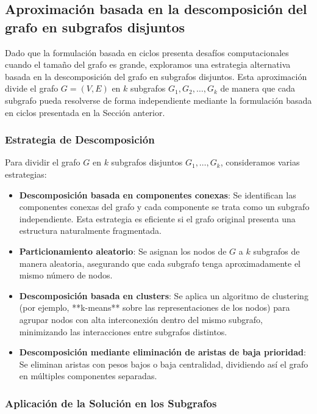 \documentclass[twocolumn, fontsize=10pt]{article}
\begin{document}
\subsection{Aproximación basada en la descomposición del grafo en subgrafos disjuntos}

Dado que la formulación basada en ciclos presenta desafíos computacionales cuando el tamaño del grafo es grande, exploramos una estrategia alternativa basada en la descomposición del grafo en subgrafos disjuntos. Esta aproximación divide el grafo \( G = (V, E) \) en \( k \) subgrafos \( G_1, G_2, \dots, G_k \) de manera que cada subgrafo pueda resolverse de forma independiente mediante la formulación basada en ciclos presentada en la Sección anterior.


\subsubsection{Estrategia de Descomposición}

Para dividir el grafo \( G \) en \( k \) subgrafos disjuntos \( G_1, \dots, G_k \), consideramos varias estrategias:

\begin{itemize}
    \item \textbf{Descomposición basada en componentes conexas}: Se identifican las componentes conexas del grafo y cada componente se trata como un subgrafo independiente. Esta estrategia es eficiente si el grafo original presenta una estructura naturalmente fragmentada.
    \item \textbf{Particionamiento aleatorio}: Se asignan los nodos de \( G \) a \( k \) subgrafos de manera aleatoria, asegurando que cada subgrafo tenga aproximadamente el mismo número de nodos.
    \item \textbf{Descomposición basada en clusters}: Se aplica un algoritmo de clustering (por ejemplo, **k-means** sobre las representaciones de los nodos) para agrupar nodos con alta interconexión dentro del mismo subgrafo, minimizando las interacciones entre subgrafos distintos.
    \item \textbf{Descomposición mediante eliminación de aristas de baja prioridad}: Se eliminan aristas con pesos bajos o baja centralidad, dividiendo así el grafo en múltiples componentes separadas.
\end{itemize}

\subsubsection{Aplicación de la Solución en los Subgrafos}
\end{document}
